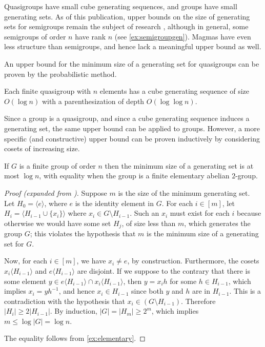 \documentclass{article}
\newcommand{\todo}[1]{\textbf{TODO #1}}
\newcommand{\gen}[1]{\langle #1 \rangle}
\begin{document}
Quasigroups have small cube generating sequences, and groups have small generating sets.
As of this publication, upper bounds on the size of generating sets for semigroups remain the subject of research \autocite{gray14}, although in general, some semigroups of order $n$ have rank $n$ (see \autoref{ex:semigroupgen}).
Magmas have even less structure than semigroups, and hence lack a meaningful upper bound as well.

An upper bound for the minimum size of a generating set for quasigroups can be proven by the probabilistic method.

\begin{lemma}\label{lem:small}
  Each finite quasigroup with $n$ elements has a cube generating sequence of size $O(\log n)$ with a parenthesization of depth $O(\log \log n)$.
\end{lemma}

Since a group is a quasigroup, and since a cube generating sequence induces a generating set, the same upper bound can be applied to groups.
However, a more specific (and constructive) upper bound can be proven inductively by considering cosets of increasing size.

\begin{lemma}\label{lem:log}
  If $G$ is a finite group of order $n$ then the minimum size of a generating set is at most $\log n$, with equality when the group is a finite elementary abelian $2$-group.
\end{lemma}
\begin{proof}[Proof (expanded from \autocite{arvind07})]
  Suppose $m$ is the size of the minimum generating set.
  Let $H_0 = \gen{e}$, where $e$ is the identity element in $G$.
  For each $i \in [m]$, let $H_i = \gen{H_{i - 1} \cup \{x_i\}}$ where $x_i \in G \setminus H_{i - 1}$.
  Such an $x_i$ must exist for each $i$ because otherwise we would have some set $H_j$, of size less than $m$, which generates the group $G$; this violates the hypothesis that $m$ is the minimum size of a generating set for $G$.

  Now, for each $i \in [m]$, we have $x_i \neq e$, by construction.
  Furthermore, the cosets $x_i \gen{H_{i - 1}}$ and $e \gen{H_{i - 1}}$ are disjoint.
  If we suppose to the contrary that there is some element $y \in e \gen{H_{i - 1}} \cap x_i \gen{H_{i - 1}}$, then $y = x_i h$ for some $h \in H_{i - 1}$, which implies $x_i = yh^{-1}$, and hence $x_i \in H_{i - 1}$ since both $y$ and $h$ are in $H_{i - 1}$.
  This is a contradiction with the hypothesis that $x_i \in (G \setminus H_{i - 1})$.
  Therefore $|H_i| \geq 2 |H_{i - 1}|$.
  By induction, $|G| = |H_m| \geq 2^m$, which implies $m \leq \log |G| = \log n$.

  The equality follows from \autoref{ex:elementary}.
\end{proof}
\end{document}
